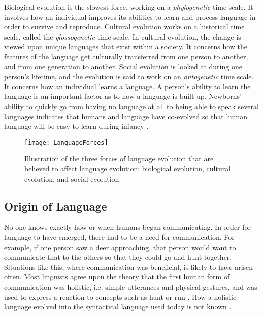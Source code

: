 Biological evolution is the slowest force, working on a \textit{phylogenetic} time scale. It involves how an individual improves its abilities to learn and process language in order to survive and reproduce.
Cultural evolution works on a historical time scale, called the \textit{glossogenetic} time scale. In cultural evolution, the change is viewed upon unique languages that exist within a society. It concerns how the features of the language get culturally transferred from one person to another, and from one generation to another.
Social evolution is looked at during one person's lifetime, and the evolution is said to work on an \textit{ontogenetic} time scale. It concerns how an individual learns a language. A person's ability to learn the language is an important factor as to how a language is built up. Newborns' ability to quickly go from having no language at all to being able to speak several languages indicates that humans and language have co-evolved so that human language will be easy to learn during infancy \citep{tomasello2003makes}.

\begin{figure}[ht]
    \centering
    \texttt{[image: LanguageForces]}
    \caption[Illustration of the three forces of language evolution.]{Illustration of the three forces of language evolution that are believed to affect language evolution: biological evolution, cultural evolution, and social evolution.}
    \label{fig:LanguageForces}
\end{figure}

\subsection{Origin of Language}
No one knows exactly how or when humans began communicating. In order for language to have emerged, there had to be a need for communication. For example, if one person saw a deer approaching, that person would want to communicate that to the others so that they could go and hunt together. Situations like this, where communication was beneficial, is likely to have arisen often. Most linguists agree upon the theory that the first human form of communication was holistic, i.e. simple utterances and physical gestures, and was used to express a reaction to concepts such as hunt or run \citep{christiansen2003language}. How a holistic language evolved into the syntactical language used today is not known \citep{bickerton2007language}.

